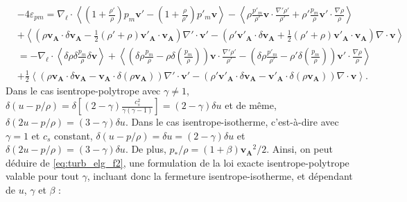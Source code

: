  \begin{align}
\label{eq:turb_ref_pm}&-4\varepsilon_{pm}=  \nabla_{\boldsymbol{\ell}} \cdot \left<\left(1+\frac{\rho'}{\rho}\right) p_m \boldsymbol{v'} - \left(1+\frac{\rho}{\rho'}\right)p'_m\boldsymbol{v} \right> - \left<\rho \frac{p'_m}{\rho'} \boldsymbol{v} \cdot \frac{\nabla'\rho'}{\rho'} + \rho' \frac{p_m}{\rho} \boldsymbol{v'} \cdot \frac{\nabla\rho}{\rho}\right> \nonumber\\
    &+\left<\left(\rho \boldsymbol{v_A} \cdot \delta \boldsymbol{v_A} - \frac{1}{2}\left(\rho' + \rho\right) \boldsymbol{v'_A} \cdot \boldsymbol{v_A}\right)\nabla' \cdot \boldsymbol{v'} - \left(\rho' \boldsymbol{v'_A} \cdot \delta \boldsymbol{v_A} + \frac{1}{2}\left(\rho' + \rho\right) \boldsymbol{v'_A} \cdot \boldsymbol{v_A}\right)\nabla \cdot \boldsymbol{v}\right> \nonumber \\
    &=- \nabla_{\boldsymbol{\ell}} \cdot \left<\delta \rho  \delta \frac{p_m}{\rho} \delta \boldsymbol{v} \right> + \left<\left(\delta \rho \frac{p_m}{\rho} - \rho \delta \left(\frac{p_m}{\rho}\right)\right)\boldsymbol{v} \cdot \frac{\nabla' \rho'}{\rho'} - \left(\delta \rho \frac{p'_m}{\rho'} - \rho' \delta \left(\frac{p_m}{\rho}\right)\right)\boldsymbol{v'} \cdot \frac{\nabla \rho}{\rho}\right>\nonumber\\
    &+\frac{1}{2}\left<\left(\rho \boldsymbol{v_A} \cdot \delta \boldsymbol{v_A} - \boldsymbol{v_A} \cdot \delta \left(\rho \boldsymbol{v_A}\right)\right)\nabla' \cdot \boldsymbol{v'} - \left(\rho' \boldsymbol{v'_A} \cdot \delta \boldsymbol{v_A} - \boldsymbol{v'_A} \cdot \delta \left(\rho \boldsymbol{v_A}\right)\right)\nabla \cdot \boldsymbol{v}\right>.
     \end{align}
% 
Dans le cas isentrope-polytrope avec $\gamma \neq 1$, $\delta \left(u - p/\rho\right) = \delta [\left(2-\gamma\right)\frac{c^2_s}{\gamma\left(\gamma-1\right)}] = \left(2-\gamma\right)\delta u$ et de même, $\delta \left(2u - p/\rho\right) = \left(3-\gamma\right)\delta u$. Dans le cas isentrope-isotherme, c'est-à-dire avec $\gamma = 1$ et $c_s$ constant, $\delta \left(u - p/\rho\right) = \delta u = \left(2-\gamma\right)\delta u$ et  $\delta \left(2u - p/\rho\right) = \left(3-\gamma\right)\delta u$. De plus, $p_*/\rho = \left(1+\beta\right) \boldsymbol{v_A}^2/2 $. Ainsi, on peut déduire de \eqref{eq:turb_elg_f2}, une formulation de la loi exacte isentrope-polytrope valable pour tout $\gamma$, incluant donc la fermeture isentrope-isotherme, et dépendant de $u$, $\gamma$ et $\beta$ : 
